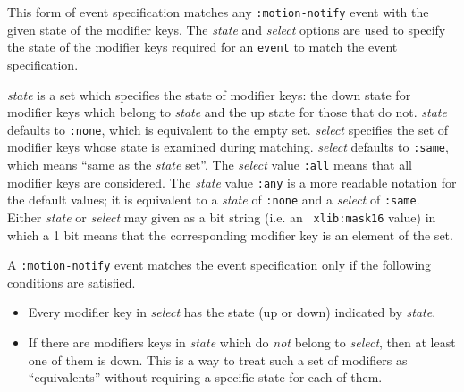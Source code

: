 \begin{flushright}
\parbox[t]{5.75in}{
This
form of event specification matches any {\tt :motion-notify}
event with the given state of the
modifier keys.
The {\em state} and {\em select} options are used to specify the state of the
modifier keys required for an {\tt event} to match the event specification.
}

\parbox[t]{5.75in}{
{\em state} is a set which specifies the state of modifier keys: the
down state for modifier keys which belong to {\em state} and the up
state for those that do not.  
{\em state} defaults to {\tt :none}, which is equivalent to the empty set.
{\em select} specifies the set of modifier keys whose state is examined
during matching. {\em select} defaults to {\tt :same}, which means
``same as the {\em state} set''. The {\em select} value {\tt :all}
means that
all modifier keys are considered.
The {\em state} value {\tt :any} is a more readable notation for the default
values; it is equivalent to a {\em state} of {\tt :none} and a {\em select} of
{\tt :same}.
Either {\em state} or {\em select} may given as a bit string (i.e. an {\tt
xlib:mask16} value) in which a 1 bit means that the corresponding
modifier key is an element of the set.
}

\parbox[t]{5.75in}{
A {\tt :motion-notify} event matches the event specification only if the
following conditions are satisfied.
\begin{itemize}
\item Every modifier key in {\em select} has the state (up or down)
indicated by {\em state}. 
\item If there are modifiers keys in {\em state} which do {\em not}
belong to {\em select}, then at least one of
them is down.  This is a way to treat such a set of modifiers as
``equivalents'' without requiring a specific state for each of them.
\end{itemize}
}
\end{flushright}

